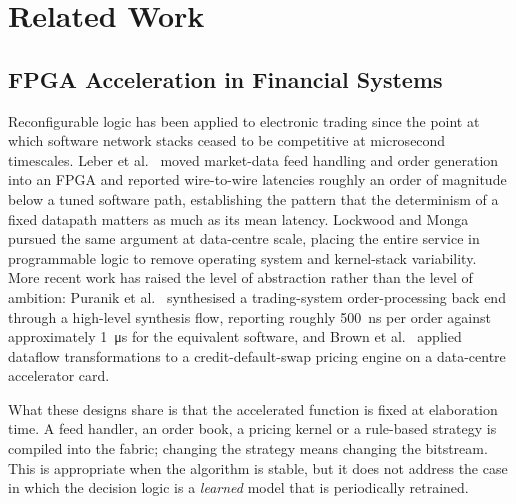 \documentclass[final,5p,times,twocolumn]{elsarticle}
\begin{document}
\section{Related Work}
\subsection{FPGA Acceleration in Financial Systems}
Reconfigurable logic has been applied to electronic trading since the point at
which software network stacks ceased to be competitive at microsecond
timescales. Leber et al.~\cite{Leber2011} moved market-data feed handling and
order generation into an FPGA and reported wire-to-wire latencies roughly an
order of magnitude below a tuned software path, establishing the pattern that
the determinism of a fixed datapath matters as much as its mean latency.
Lockwood and Monga~\cite{Lockwood2015} pursued the same argument at data-centre
scale, placing the entire service in programmable logic to remove operating
system and kernel-stack variability. More recent work has raised the level of
abstraction rather than the level of ambition: Puranik et
al.~\cite{Puranik2023} synthesised a trading-system order-processing back end
through a high-level synthesis flow, reporting roughly \SI{500}{\nano\second} per
order against approximately \SI{1}{\micro\second} for the equivalent software,
and Brown et al.~\cite{Brown2021} applied dataflow transformations to a
credit-default-swap pricing engine on a data-centre accelerator card.

What these designs share is that the accelerated function is fixed at
elaboration time. A feed handler, an order book, a pricing kernel or a
rule-based strategy is compiled into the fabric; changing the strategy means
changing the bitstream. This is appropriate when the algorithm is stable, but it
does not address the case in which the decision logic is a \emph{learned} model
that is periodically retrained.
\end{document}
